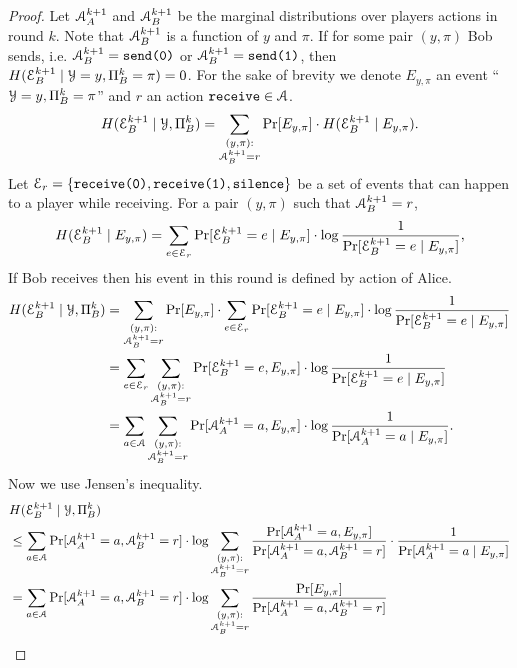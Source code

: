 \begin{proof}
	Let $\mathcal{A}^{k+1}_A$ and $\mathcal{A}^{k+1}_B$ be the marginal distributions over players actions in round $k$. 
	Note that $\mathcal{A}^{k+1}_B$ is a function of $y$ and $\pi$. 
	If for some pair $(y,\pi)$ Bob sends, 
	i.e. $\mathcal{A}^{k+1}_B = \texttt{send(0)}$ or $\mathcal{A}^{k+1}_B = \texttt{send(1)}$, then $H(\mathcal{E}^{k+1}_B\mid\mathcal{Y}=y,\Pi^k_B=\pi) = 0$. For the sake of brevity we denote $E_{y,\pi}$ an event ``$\mathcal{Y}=y,\Pi^k_B=\pi$'' and $r$ an action $\texttt{receive} \in\mathcal{A}$.
	\[
	H(\mathcal{E}^{k+1}_B\mid\mathcal{Y},\Pi^k_B)
	=\sum_{\substack{(y,\pi):\\\mathcal{A}^{k+1}_B = r}}\Pr[E_{y,\pi}]\cdot H(\mathcal{E}^{k+1}_B\mid E_{y,\pi}).
	\]
	Let $\mathcal{E}_r = \{\texttt{receive(0)}, \texttt{receive(1)}, \texttt{silence}\}$ be a set of events that can happen to a player while receiving. For a pair $(y,\pi)$ such that  $\mathcal{A}_B^{k+1} = r$,
	\[
	H(\mathcal{E}^{k+1}_B\mid E_{y,\pi})=\sum_{e\in \mathcal{E}_r} \Pr[\mathcal{E}^{k+1}_B = e \mid E_{y,\pi}]\cdot \log\frac{1}{\Pr[\mathcal{E}^{k+1}_B = e \mid E_{y,\pi}]},
	\]
	If Bob receives then his event in this round is defined by action of Alice.	
	\begin{align*}
	H(\mathcal{E}^{k+1}_B\mid\mathcal{Y},\Pi^k_B)
	&=\sum_{\substack{(y,\pi):\\\mathcal{A}^{k+1}_B = r}}\Pr[E_{y,\pi}]\cdot
	\sum_{e\in \mathcal{E}_r} \Pr[\mathcal{E}^{k+1}_B = e \mid E_{y,\pi}]\cdot \log\frac{1}{\Pr[\mathcal{E}^{k+1}_B = e \mid E_{y,\pi}]}\\
	&=\sum_{e\in \mathcal{E}_r} \sum_{\substack{(y,\pi):\\\mathcal{A}^{k+1}_B = r}}
	 \Pr[\mathcal{E}^{k+1}_B = e , E_{y,\pi}]\cdot \log\frac{1}{\Pr[\mathcal{E}^{k+1}_B = e \mid E_{y,\pi}]}\\
	 &=\sum_{a\in \mathcal{A}} \sum_{\substack{(y,\pi):\\\mathcal{A}^{k+1}_B = r}}
	 \Pr[\mathcal{A}^{k+1}_A = a , E_{y,\pi}]\cdot \log\frac{1}{\Pr[\mathcal{A}^{k+1}_A = a \mid E_{y,\pi}]}.
	\end{align*}
	Now we use Jensen's inequality.
	\begin{align*}
	&H(\cE^{k+1}_B\mid\cY,\Pi^k_B)\\
	&\le \sum_{a\in \cA} 
	\Pr[\cA^{k+1}_A = a , \cA^{k+1}_B = r]\cdot \log \sum_{\substack{(y,\pi):\\\cA^{k+1}_B = r}}
	\frac{\Pr[\cA^{k+1}_A = a , E_{y,\pi}]}{\Pr[\cA^{k+1}_A = a , \cA^{k+1}_B = r]}\cdot \frac{1}{\Pr[\cA^{k+1}_A = a \mid E_{y,\pi}]}\\
	&= \sum_{a\in \cA} 
	\Pr[\cA^{k+1}_A = a , \cA^{k+1}_B = r]\cdot \log \sum_{\substack{(y,\pi):\\\cA^{k+1}_B = r}}
	\frac{\Pr[E_{y,\pi}]}{\Pr[\cA^{k+1}_A = a , \cA^{k+1}_B = r]}\\

\end{align*}
\end{proof}
